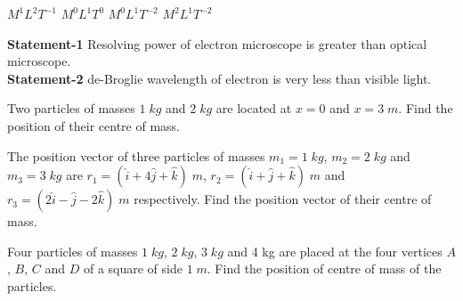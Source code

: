 \documentclass[10pt, a4paper]{exam}
\begin{document}
\begin{multicols*}{2}
\begin{questions}
        \begin{oneparchoices}
            \choice $ M^{1}L^{2}T^{-1}$
            \choice $ M^{0}L^{1}T^{0}$
            \choice $ M^{0}L^{1}T^{-2}$
            \choice $ M^{2}L^{1}T^{-2}$
        \end{oneparchoices}

        \question \textbf{Statement-1} Resolving power of electron microscope is greater than optical microscope. \\
                    \textbf{Statement-2} de-Broglie wavelength of electron is very less than visible light.


        \question Two particles of masses $1 \;kg$ and $2 \;kg$ are located at $x = 0$ and $x = 3\;m$. Find the position of their centre of mass.

        \question The position vector of three particles of masses $m_{1}=1\;kg$, $m_{2}=2\;kg$ and $m_{3}=3\;kg$ are
        $r_1 = (\hat{i} + 4\hat{j} + \hat{k})\;m$, $r_2 = (\hat{i} + \hat{j} + \hat{k})\;m$ and
        $r_3 = (2\hat{i} - \hat{j} - 2\hat{k})\;m$ respectively. Find the position vector of their centre of mass.

        \question Four particles of masses $1 \;kg$, $2 \;kg$, $3 \;kg$ and 4 kg are placed at
        the four vertices $A$, $B$, $C$ and $D$ of a square of side $1 \;m$. Find the position of
        centre of mass of the particles.

    \end{questions}
    

	\end{multicols*}	
\end{document}
